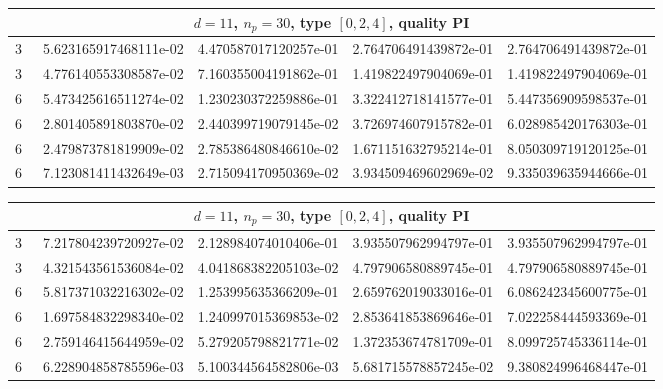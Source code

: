 \documentclass{article}
\begin{document}
\begin{center}
\begin{tabular}{rrrrr}
\multicolumn{5}{c}{\rmfamily $d=11$, $n_p=30$, type $[0,2,4]$, quality PI}\\
\toprule
3 & ~5.623165917468111e-02 & 4.470587017120257e-01 & 2.764706491439872e-01 & 2.764706491439872e-01\\
3 & ~4.776140553308587e-02 & 7.160355004191862e-01 & 1.419822497904069e-01 & 1.419822497904069e-01\\
6 & ~5.473425616511274e-02 & 1.230230372259886e-01 & 3.322412718141577e-01 & 5.447356909598537e-01\\
6 & ~2.801405891803870e-02 & 2.440399719079145e-02 & 3.726974607915782e-01 & 6.028985420176303e-01\\
6 & ~2.479873781819909e-02 & 2.785386480846610e-02 & 1.671151632795214e-01 & 8.050309719120125e-01\\
6 & ~7.123081411432649e-03 & 2.715094170950369e-02 & 3.934509469602969e-02 & 9.335039635944666e-01\\
\bottomrule
\end{tabular}
\bigskip

\begin{tabular}{rrrrr}
\multicolumn{5}{c}{\rmfamily $d=11$, $n_p=30$, type $[0,2,4]$, quality PI}\\
\toprule
3 & ~7.217804239720927e-02 & 2.128984074010406e-01 & 3.935507962994797e-01 & 3.935507962994797e-01\\
3 & ~4.321543561536084e-02 & 4.041868382205103e-02 & 4.797906580889745e-01 & 4.797906580889745e-01\\
6 & ~5.817371032216302e-02 & 1.253995635366209e-01 & 2.659762019033016e-01 & 6.086242345600775e-01\\
6 & ~1.697584832298340e-02 & 1.240997015369853e-02 & 2.853641853869646e-01 & 7.022258444593369e-01\\
6 & ~2.759146415644959e-02 & 5.279205798821771e-02 & 1.372353674781709e-01 & 8.099725745336114e-01\\
6 & ~6.228904858785596e-03 & 5.100344564582806e-03 & 5.681715578857245e-02 & 9.380824996468447e-01\\
\bottomrule
\end{tabular}
\bigskip


\end{center}
\end{document}
